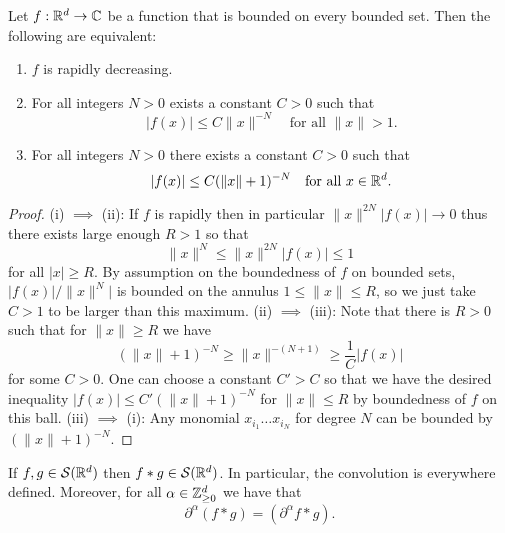 \documentclass[twoside, a4paper, 10pt]{amsart}
\begin{document}
\begin{lemma} Let $f:\mathbb{R}^d \to \mathbb{C}$ be a function that is bounded on every bounded set. Then the following are equivalent:

\begin{enumerate}
	\item $f$ is rapidly decreasing.
	\item For all integers $N>0$ exists a constant $C>0$ such that $$|f(x)| \leq C\| x \|^{-N} \quad\text{for all } \|x\| > 1.$$
	\item For all integers $N>0$ there exists a constant $C>0$ such that $$|f(x)| \leq C(\| x \| + 1)^{-N} \quad\text{for all } x \in \mathbb{R}^d.$$
\end{enumerate}

\end{lemma}

\begin{proof} (i) $\implies$ (ii): If $f$ is rapidly then in particular $\|x\|^{2N}|f(x)| \to 0$ thus there exists large enough $R>1$ so that $$\|x\|^{N} \leq \|x\|^{2N}|f(x)| \leq 1$$ for all $|x| \geq R$. By assumption on the boundedness of $f$ on bounded sets, $|f(x)|/\|x\|^{N}|$ is bounded on the annulus $1\leq \|x\| \leq R$, so we just take $C>1$ to be larger than this maximum. (ii) $\implies$ (iii): Note that there is $R>0$ such that for $\|x \| \geq R$ we have $$(\|x \|+1)^{-N} \geq \| x \|^{-(N+1)} \geq \frac{1}{C}|f(x)|$$ for some $C>0$. One can choose a constant $C'>C$ so that we have the desired inequality $|f(x)| \leq C'(\| x \| + 1)^{-N}$ for $\|x \| \leq R$ by boundedness of $f$ on this ball. (iii) $\implies$ (i): Any monomial $x_{i_1} \ldots x_{i_N}$ for degree $N$ can be bounded by $(\|x\| + 1)^{-N}$. \end{proof}


\begin{prop} If $f,g \in \mathcal{S}(\mathbb{R}^d)$ then $f*g \in \mathcal{S}(\mathbb{R}^d)$. In particular, the convolution is everywhere defined. Moreover, for all $\alpha \in \mathbb{Z}_{\geq 0}^d$ we have that $$\partial^{\alpha} (f * g) = (\partial^{\alpha}f * g).$$

\end{prop}
\end{document}
